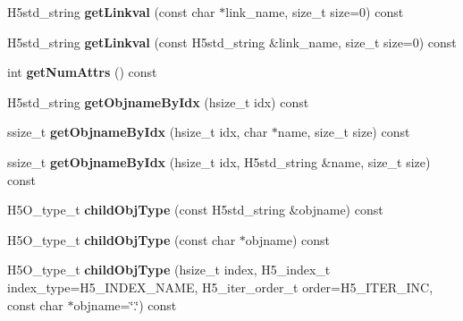 \begin{DoxyCompactItemize}
H5std\+\_\+string {\bfseries get\+Linkval} (const char $\ast$link\+\_\+name, size\+\_\+t size=0) const
\item 
\mbox{\label{class_h5_1_1_h5_location_af9d3ed7cbfddaaf0b642f792c556044e}} 
H5std\+\_\+string {\bfseries get\+Linkval} (const H5std\+\_\+string \&link\+\_\+name, size\+\_\+t size=0) const
\item 
\mbox{\label{class_h5_1_1_h5_location_a7259cdf53d511a4d6bcca4bd135b9372}} 
int {\bfseries get\+Num\+Attrs} () const
\item 
\mbox{\label{class_h5_1_1_h5_location_a6da3b0f98dda25eb4523f1cf1091c41b}} 
H5std\+\_\+string {\bfseries get\+Objname\+By\+Idx} (hsize\+\_\+t idx) const
\item 
\mbox{\label{class_h5_1_1_h5_location_a3be80465b52a3101faa247d5613882f7}} 
ssize\+\_\+t {\bfseries get\+Objname\+By\+Idx} (hsize\+\_\+t idx, char $\ast$name, size\+\_\+t size) const
\item 
\mbox{\label{class_h5_1_1_h5_location_a3b6afb6ee63f0d6b1587ecdc28828b42}} 
ssize\+\_\+t {\bfseries get\+Objname\+By\+Idx} (hsize\+\_\+t idx, H5std\+\_\+string \&name, size\+\_\+t size) const
\item 
\mbox{\label{class_h5_1_1_h5_location_a2c0eec3da0e8ac483d7f1acf017459f4}} 
H5\+O\+\_\+type\+\_\+t {\bfseries child\+Obj\+Type} (const H5std\+\_\+string \&objname) const
\item 
\mbox{\label{class_h5_1_1_h5_location_a17dda29427ad529b34b8c6315e04f070}} 
H5\+O\+\_\+type\+\_\+t {\bfseries child\+Obj\+Type} (const char $\ast$objname) const
\item 
\mbox{\label{class_h5_1_1_h5_location_a557965418005dd9250c1b92c6580b2ac}} 
H5\+O\+\_\+type\+\_\+t {\bfseries child\+Obj\+Type} (hsize\+\_\+t index, H5\+\_\+index\+\_\+t index\+\_\+type=H5\+\_\+\+I\+N\+D\+E\+X\+\_\+\+N\+A\+ME, H5\+\_\+iter\+\_\+order\+\_\+t order=H5\+\_\+\+I\+T\+E\+R\+\_\+\+I\+NC, const char $\ast$objname=\char`\"{}.\char`\"{}) const
\item 

\end{DoxyCompactItemize}
